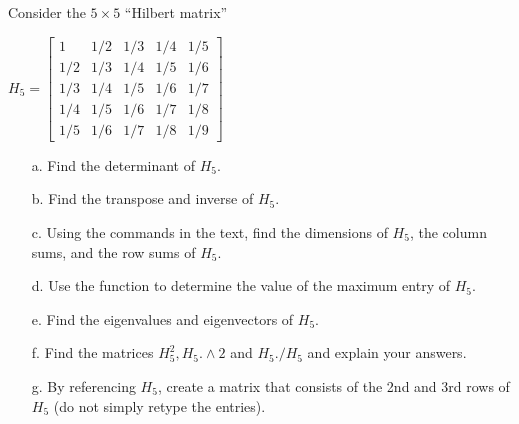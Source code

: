 {Consider the $5 \times 5$ ``Hilbert matrix''

$
H_5
=
\left[
\begin{array}{ccccc}
1 & 1/2 & 1/3 & 1/4 & 1/5\\
1/2 & 1/3 & 1/4 & 1/5 & 1/6\\
1/3 & 1/4 & 1/5 & 1/6 &  1/7\\
1/4 & 1/5 & 1/6 & 1/7 & 1/8\\
1/5 & 1/6 & 1/7 & 1/8 & 1/9
\end{array}
\right]
$

\begin{enumerate}
	\item[a.] Find the determinant of $H_5$. 
	\item[b.] Find the transpose and inverse of $H_5$.
	\item[c.] Using the commands in the text, find the dimensions of $H_5$, the column sums, and the row sums of $H_5$.
	\item[d.] Use the  function to determine the value of the maximum entry of $H_5$.
	\item[e.] Find the eigenvalues and eigenvectors of $H_5$.
	\item[f.] Find the matrices $H_5^2, H_5.\land 2$ and $H_5./H_5$ and explain your answers.
	\item[g.] By referencing $H_5$, create a matrix that consists of the 2nd and 3rd rows of $H_5$ (do not simply retype the entries).
\end{enumerate}}
{}